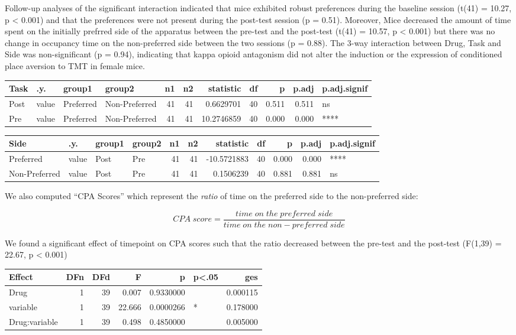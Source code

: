 \documentclass[
]{book}
\begin{document}
Follow-up analyses of the significant interaction indicated that mice exhibited robust preferences during the baseline session (t(41) = 10.27, p \textless{} 0.001) and that the preferences were not present during the post-test session (p = 0.51). Moreover, Mice decreased the amount of time spent on the initially prefrred side of the apparatus between the pre-test and the post-test (t(41) = 10.57, p \textless{} 0.001) but there was no change in occupancy time on the non-preferred side between the two sessions (p = 0.88). The 3-way interaction between Drug, Task and Side was non-significant (p = 0.94), indicating that kappa opioid antagonism did not alter the induction or the expression of conditioned place aversion to TMT in female mice.

\begin{tabular}{l|l|l|l|r|r|r|r|r|r|l}
\hline
Task & .y. & group1 & group2 & n1 & n2 & statistic & df & p & p.adj & p.adj.signif\\
\hline
Post & value & Preferred & Non-Preferred & 41 & 41 & 0.6629701 & 40 & 0.511 & 0.511 & ns\\
\hline
Pre & value & Preferred & Non-Preferred & 41 & 41 & 10.2746859 & 40 & 0.000 & 0.000 & ****\\
\hline
\end{tabular}

\begin{tabular}{l|l|l|l|r|r|r|r|r|r|l}
\hline
Side & .y. & group1 & group2 & n1 & n2 & statistic & df & p & p.adj & p.adj.signif\\
\hline
Preferred & value & Post & Pre & 41 & 41 & -10.5721883 & 40 & 0.000 & 0.000 & ****\\
\hline
Non-Preferred & value & Post & Pre & 41 & 41 & 0.1506239 & 40 & 0.881 & 0.881 & ns\\
\hline
\end{tabular}

We also computed ``CPA Scores'' which represent the \emph{ratio} of time on the preferred side to the non-preferred side:

\[CPA \; score = \frac{time \;on \;the \;preferred \;side}{time \;on \;the \;non-preferred \;side}\]

We found a significant effect of timepoint on CPA scores such that the ratio decreased between the pre-test and the post-test (F(1,39) = 22.67, p \textless{} 0.001)

\begin{tabular}{l|r|r|r|r|l|r}
\hline
Effect & DFn & DFd & F & p & p<.05 & ges\\
\hline
Drug & 1 & 39 & 0.007 & 0.9330000 &  & 0.000115\\
\hline
variable & 1 & 39 & 22.666 & 0.0000266 & * & 0.178000\\
\hline
Drug:variable & 1 & 39 & 0.498 & 0.4850000 &  & 0.005000\\
\hline
\end{tabular}
\end{document}

